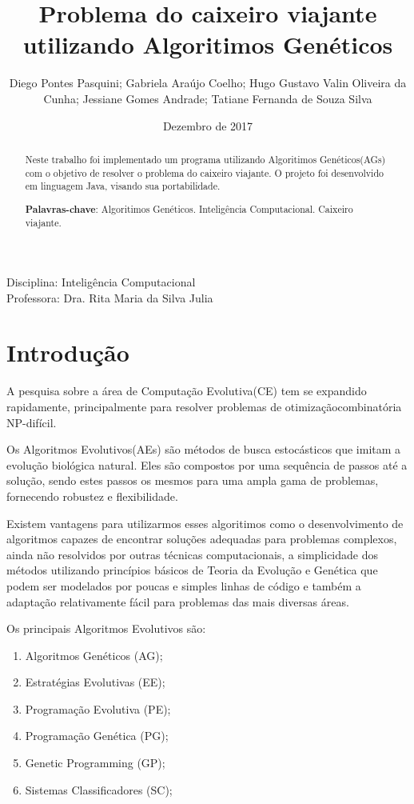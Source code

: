 \documentclass[
article,			%
11pt,				%
oneside,			%
a4paper,			%
english,			%
brazil,				%
sumario=tradicional
]{article}
\title{\textbf{Problema do caixeiro viajante utilizando Algoritimos Genéticos}}
\author{Diego Pontes Pasquini; Gabriela Araújo Coelho; Hugo Gustavo Valin Oliveira da Cunha; Jessiane Gomes Andrade; Tatiane Fernanda de Souza Silva}
\date{Dezembro de 2017}
\begin{document}
	
	\maketitle
	
	\begin{center}
		\small
		Disciplina: Inteligência Computacional \\
		\small
		Professora: Dra. Rita Maria da Silva Julia
	\end{center}
	
	\begin{abstract}
		Neste trabalho foi implementado um programa utilizando Algoritimos Genéticos(AGs) com o objetivo de resolver o problema do caixeiro viajante. O projeto foi desenvolvido em linguagem Java, visando sua portabilidade.  	
		\vspace{20px}
		
		\noindent
		\textbf{Palavras-chave}: Algoritimos Genéticos. Inteligência Computacional. Caixeiro viajante.
	\end{abstract}
	

	\section{Introdução}

	A pesquisa sobre a área de Computação Evolutiva(CE) tem se expandido rapidamente, principalmente para resolver problemas de otimizaçãocombinatória NP-difícil.
	
	Os Algoritmos Evolutivos(AEs) são métodos de busca estocásticos que imitam a evolução biológica natural. Eles são compostos por uma sequência de passos até a solução, sendo estes passos os mesmos para uma ampla gama de problemas, fornecendo robustez e flexibilidade.
	
	Existem vantagens para utilizarmos esses algoritimos como o desenvolvimento de algoritmos capazes de encontrar soluções adequadas para problemas complexos, ainda não resolvidos por outras técnicas computacionais, a simplicidade dos métodos utilizando princípios básicos de Teoria da Evolução e Genética que podem ser modelados por poucas e simples linhas de código e também a adaptação relativamente fácil para problemas das mais diversas áreas.
	
	\vspace{10px}

	Os principais Algoritmos Evolutivos são:
	\begin{enumerate}
		\item Algoritmos Genéticos (AG);
		\item Estratégias Evolutivas (EE);
		\item Programação Evolutiva (PE);
		\item Programação Genética (PG); 
		\item Genetic Programming (GP);
		\item Sistemas Classificadores (SC);
	\end{enumerate}
\end{document}
